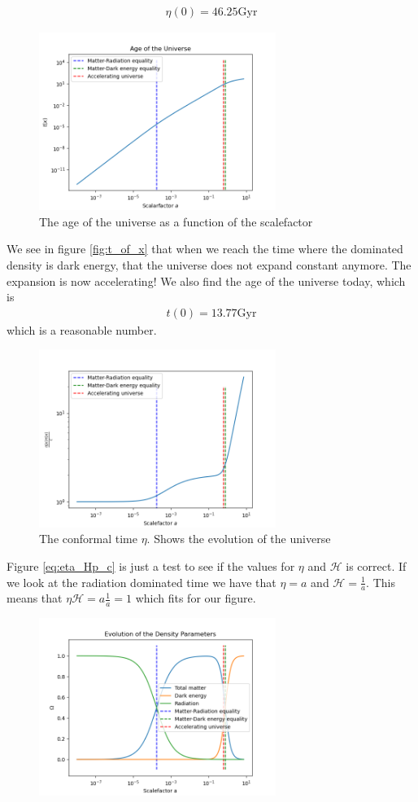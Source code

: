 \documentclass{article}
\begin{document}
\begin{multicols}{2}
\begin{align}
    \eta(0)=46.25\text{Gyr}
\end{align}
\begin{figure}[H]
	\centering
	\includegraphics[width=77mm]{t_of_x.png}
	\caption{The age of the universe as a function of the scalefactor}
	\label{fig:t_of_x}
\end{figure}
We see in figure \eqref{fig:t_of_x} that when we reach the time where the dominated density is dark energy, that the universe does not expand constant anymore. The expansion is now accelerating! We also find the age of the universe today, which is
\begin{align}
    t(0)=13.77 \text{Gyr}
\end{align}
which is a reasonable number.
\begin{figure}[H]
	\centering
	\includegraphics[width=77mm]{eta_Hp_c.png}
	\caption{The conformal time $\eta$. Shows the evolution of the universe}
	\label{eq:eta_Hp_c}
\end{figure}
Figure \eqref{eq:eta_Hp_c} is just a test to see if the values for $\eta$ and $\mathcal{H}$ is correct. If we look at the radiation dominated time we have that $\eta=a$ and $\mathcal{H}=\frac{1}{a}$. This means that $\eta\mathcal{H}=a\frac{1}{a}=1$ which fits for our figure. 
\begin{figure}[H]
	\centering
	\includegraphics[width=77mm]{Omega.png}

\end{figure}
\end{multicols}
\end{document}
